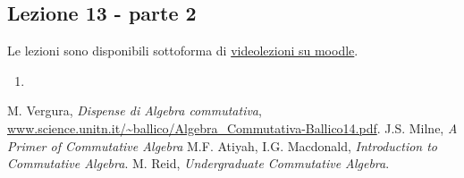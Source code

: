 \documentclass[italian]{article}
\begin{document}
	\subsection{Lezione 13 - parte 2}
	
	Le lezioni sono disponibili sottoforma di 
	\href{https://didatticaonline.unitn.it/dol/course/view.php?id=23268}{videolezioni
		su moodle}.
	
	\begin{enumerate}
		\item 
	\end{enumerate}  

    \begin{thebibliography}{9}
       M. Vergura, \textit{Dispense di Algebra commutativa},
        \url{www.science.unitn.it/~ballico/Algebra_Commutativa-Ballico14.pdf}.
       J.S. Milne, \textit{A Primer of Commutative Algebra}
       M.F. Atiyah, I.G. Macdonald, \textit{Introduction to 
            Commutative Algebra}.
       M. Reid, \textit{Undergraduate Commutative Algebra}.
    \end{thebibliography}
\end{document}
